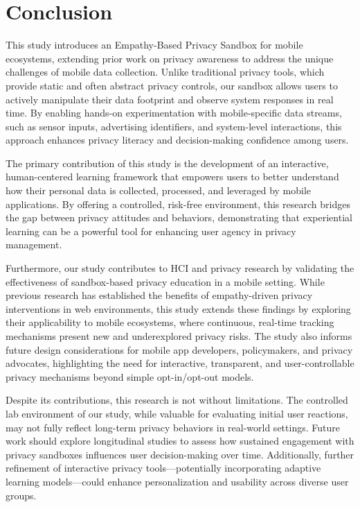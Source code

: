\documentclass[acmlarge, nonacm]{acmart}
\begin{document}
\section{Conclusion}

This study introduces an Empathy-Based Privacy Sandbox for mobile ecosystems, extending prior work on privacy awareness to address the unique challenges of mobile data collection. Unlike traditional privacy tools, which provide static and often abstract privacy controls, our sandbox allows users to actively manipulate their data footprint and observe system responses in real time. By enabling hands-on experimentation with mobile-specific data streams, such as sensor inputs, advertising identifiers, and system-level interactions, this approach enhances privacy literacy and decision-making confidence among users.

The primary contribution of this study is the development of an interactive, human-centered learning framework that empowers users to better understand how their personal data is collected, processed, and leveraged by mobile applications. By offering a controlled, risk-free environment, this research bridges the gap between privacy attitudes and behaviors, demonstrating that experiential learning can be a powerful tool for enhancing user agency in privacy management.

Furthermore, our study contributes to HCI and privacy research by validating the effectiveness of sandbox-based privacy education in a mobile setting. While previous research has established the benefits of empathy-driven privacy interventions in web environments, this study extends these findings by exploring their applicability to mobile ecosystems, where continuous, real-time tracking mechanisms present new and underexplored privacy risks. The study also informs future design considerations for mobile app developers, policymakers, and privacy advocates, highlighting the need for interactive, transparent, and user-controllable privacy mechanisms beyond simple opt-in/opt-out models.

Despite its contributions, this research is not without limitations. The controlled lab environment of our study, while valuable for evaluating initial user reactions, may not fully reflect long-term privacy behaviors in real-world settings. Future work should explore longitudinal studies to assess how sustained engagement with privacy sandboxes influences user decision-making over time. Additionally, further refinement of interactive privacy tools—potentially incorporating adaptive learning models—could enhance personalization and usability across diverse user groups.
\end{document}
